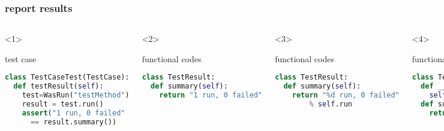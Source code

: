 \documentclass[lualatex]{beamer}
\begin{document}
\begin{frame}[fragile,t]
    \frametitle{report results}

    \begin{columns}[t]
        \small
        \begin{onlyenv}<1>
            \begin{block}{test case}
                \begin{lstlisting}[language=Python,columns=fullflexible]
class TestCaseTest(TestCase):
  def testResult(self):
    test=WasRun("testMethod")
    result = test.run()
    assert("1 run, 0 failed"
      == result.summary())
                \end{lstlisting}
            \end{block}
        \end{onlyenv}

        \begin{onlyenv}<2>
            \begin{block}{functional codes}
                \begin{lstlisting}[language=Python,columns=fullflexible]
class TestResult:
  def summary(self):
    return "1 run, 0 failed"
                \end{lstlisting}
            \end{block}
        \end{onlyenv}

        \begin{onlyenv}<3>
            \begin{block}{functional codes}
                \begin{lstlisting}[language=Python,columns=fullflexible]
class TestResult:
  def summary(self):
    return "%d run, 0 failed"
        % self.run
                \end{lstlisting}
            \end{block}
        \end{onlyenv}

        \begin{onlyenv}<4>
            \begin{block}{functional codes}
                \begin{lstlisting}[language=Python,columns=fullflexible]
class TestResult:
  def __init__(self):
    self.run = 0
  def summary(self):
    return "%d run, 0 failed"
        % self.run
                \end{lstlisting}
            \end{block}
        \end{onlyenv}


\end{columns}
\end{frame}
\end{document}
